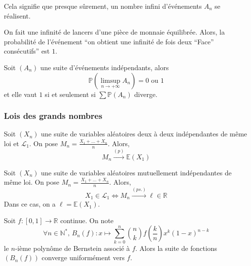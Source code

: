   \begin{remark}
    Cela signifie que presque sûrement, un nombre infini d'événements $A_n$ se réalisent.
  \end{remark}


  \begin{example}
    On fait une infinité de lancers d'une pièce de monnaie équilibrée. Alors, la probabilité de l'événement ``on obtient une infinité de fois deux ``Face'' consécutifs'' est $1$.
  \end{example}

  \begin{corollary}
    Soit $(A_n)$ une suite d'événements indépendants, alors
    \[ \mathbb{P} \left( \limsup_{n \rightarrow +\infty} A_n \right) = 0 \text{ ou } 1 \]
    et elle vaut $1$ si et seulement si $\sum \mathbb{P}(A_n)$ diverge.
  \end{corollary}

  \subsubsection{Lois des grands nombres}


  \begin{theorem}
    Soit $(X_n)$ une suite de variables aléatoires deux à deux indépendantes de même loi et $\mathcal{L}_1$. On pose $M_n = \frac{X_1 + \dots + X_n}{n}$. Alors,
    \[ M_n \overset{(p)}{\longrightarrow} \mathbb{E}(X_1) \]
  \end{theorem}


  \begin{theorem}
    Soit $(X_n)$ une suite de variables aléatoires mutuellement indépendantes de même loi. On pose $M_n = \frac{X_1 + \dots + X_n}{n}$. Alors,
    \[ X_1 \in \mathcal{L}_1 \iff M_n \overset{(ps.)}{\longrightarrow} \ell \in \mathbb{R} \]
    Dans ce cas, on a $\ell = \mathbb{E}(X_1)$.
  \end{theorem}


  \begin{application}
    Soit $f : [0,1] \rightarrow \mathbb{R}$ continue. On note
    \[ \forall n \in \mathbb{N}^*, \, B_n(f) : x \mapsto \sum_{k=0}^n \binom{n}{k} f \left( \frac{k}{n} \right) x^k (1-x)^{n-k} \]
    le $n$-ième polynôme de Bernstein associé à $f$. Alors la suite de fonctions $(B_n(f))$ converge uniformément vers $f$.
  \end{application}

